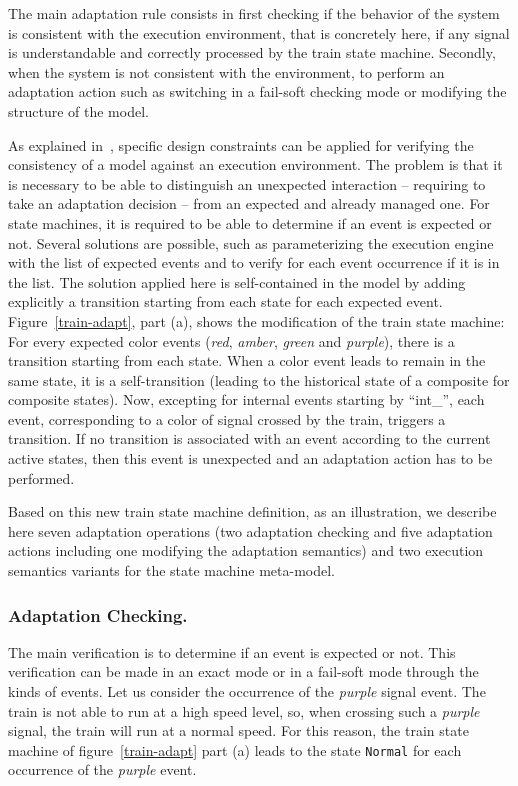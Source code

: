 \documentclass[english, 10pt]{llncs}
\begin{document}
The main adaptation rule consists in first checking if the behavior of
the system is consistent with the execution environment, that is
concretely here, if any signal is understandable and correctly
processed by the train state machine. Secondly, when the system is not
consistent with the environment, to perform an adaptation action such
as switching in a fail-soft checking mode or modifying the structure
of the model.

As explained in~\cite{cariou-ciel12,cariou-mrt12}, specific design
constraints can be applied for verifying the consistency of a model
against an execution environment. The problem is that it is necessary
to be able to distinguish an unexpected interaction -- requiring to
take an adaptation decision -- from an expected and already managed
one. For state machines, it is required to be able to determine if an
event is expected or not. Several solutions are possible, such as
parameterizing the execution engine with the list of expected events
and to verify for each event occurrence if it is in the
list. The solution applied here is self-contained in the model by
adding explicitly a transition starting from each state for each
expected event. Figure~\ref{train-adapt}, part (a), shows the
modification of the train state machine: For every expected
color events (\textit{red}, \textit{amber}, \textit{green} and
\textit{purple}), there is a transition starting from each state. When
a color event leads to remain in the same state, it is a
self-transition (leading to the historical state of a composite for
composite states). Now, excepting for internal events starting by
``int\_'', each event, corresponding to a color of signal crossed by
the train, triggers a transition. If no transition is associated with
an event according to the current active states, then this event is
unexpected and an adaptation action has to be performed.

Based on this new train state machine definition, as an illustration,
we describe here seven adaptation operations (two adaptation checking
and five adaptation actions including one modifying the adaptation
semantics) and two execution semantics variants for the state machine
meta-model.

\subsubsection{Adaptation Checking.}

The main verification is to determine if an event is expected or
not. This verification can be made in an exact mode or in a fail-soft
mode through the kinds of events. Let us consider the occurrence of the
\textit{purple} signal event. The train is not able to run at a high
speed level, so, when crossing such a \textit{purple} signal, the
train will run at a normal speed. For this reason, the train state
machine of figure~\ref{train-adapt} part (a) leads to the state
\texttt{Normal} for each occurrence of the \textit{purple} event.
\end{document}
